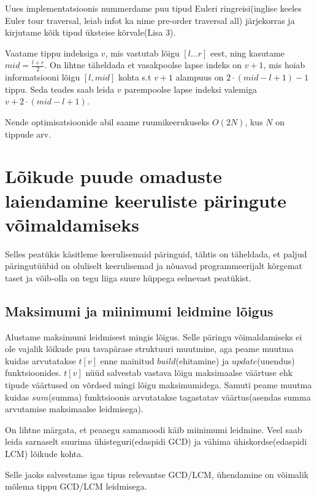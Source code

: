 \documentclass{trkut}
\begin{document}
Uues implementatsioonis nummerdame puu tipud Euleri ringreisi(inglise keeles Euler tour traversal, leiab infot ka nime pre-order traversal all) järjekorras ja kirjutame kõik tipud üksteise kõrvale(Lisa 3).

Vaatame tippu indeksiga $v$, mis vastutab lõigu $[l...r]$ eest, ning kasutame $mid =  \frac{l+r}{2}$. On lihtne täheldada et vasakpoolse lapse indeks on $v+1$, mis hoiab informatsiooni lõigu $[l, mid]$ kohta s.t $v+1$ alampuus on $2\cdot(mid-l+1)-1$ tippu. Seda teades saab leida $v$ parempoolse lapse indeksi valemiga $v+2\cdot(mid-l+1)$. \parencite{EMaxx}

Nende optimisatsioonide abil saame ruumikeerukuseks $O(2N)$, kus $N$ on tippude arv. \parencite{EMaxx}



\section{Lõikude puude omaduste laiendamine keeruliste päringute võimaldamiseks}

Selles peatükis käsitleme keerulisemaid päringuid, tähtis on täheldada, et paljud päringutüübid on oluliselt keerulisemad ja nõuavad programmeerijalt kõrgemat taset ja võib-olla on tegu liiga suure hüppega eelnevast peatükist.

\subsection{Maksimumi ja miinimumi leidmine lõigus}

Alustame maksimumi leidmisest mingis lõigus. Selle päringu võimaldamiseks ei ole vajalik lõikude puu tavapärase struktuuri muutmine, aga peame muutma kuidas arvutatakse $t[v]$ enne mainitud $build$(ehitamine) ja $update$(uuendus) funktsioonides. $t[v]$ nüüd salvestab vastava lõigu maksimaalse väärtuse ehk tipude väärtused on võrdsed mingi lõigu maksimumidega. Samuti peame muutma kuidas $sum$(summa) funktsioonis arvutatakse tagastatav väärtus(asendas summa arvutamise maksimaalse leidmisega). \parencite{EMaxx}

On lihtne märgata, et peaaegu samamoodi käib miinimumi leidmine. Veel saab leida sarnaselt suurima ühisteguri(edaspidi GCD) ja vähima ühiskordse(edaspidi LCM) lõikude kohta. 

Selle jaoks salvestame igas tipus relevantse GCD/LCM, ühendamine on võimalik mõlema tippu GCD/LCM leidmisega. \parencite{EMaxx}
\end{document}
